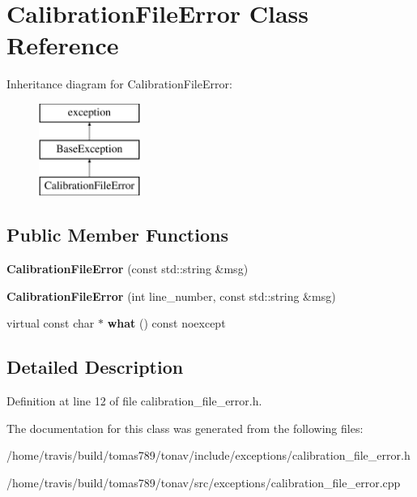 \hypertarget{class_calibration_file_error}{\section{Calibration\-File\-Error Class Reference}
\label{class_calibration_file_error}
}
Inheritance diagram for Calibration\-File\-Error\-:\begin{figure}[H]
\begin{center}
\leavevmode
\includegraphics[height=3.000000cm]{class_calibration_file_error}
\end{center}
\end{figure}
\subsection*{Public Member Functions}
\begin{DoxyCompactItemize}
\item 
\hypertarget{class_calibration_file_error_ac4403a65bb13617f6f9aaea23a408c0a}{{\bfseries Calibration\-File\-Error} (const std\-::string \&msg)}\label{class_calibration_file_error_ac4403a65bb13617f6f9aaea23a408c0a}

\item 
\hypertarget{class_calibration_file_error_a91d41fb29208c4304760a251de8ca50a}{{\bfseries Calibration\-File\-Error} (int line\-\_\-number, const std\-::string \&msg)}\label{class_calibration_file_error_a91d41fb29208c4304760a251de8ca50a}

\item 
\hypertarget{class_calibration_file_error_a935a4e242a42bb1ab4867c05f44eebc9}{virtual const char $\ast$ {\bfseries what} () const noexcept}\label{class_calibration_file_error_a935a4e242a42bb1ab4867c05f44eebc9}

\end{DoxyCompactItemize}


\subsection{Detailed Description}


Definition at line 12 of file calibration\-\_\-file\-\_\-error.\-h.



The documentation for this class was generated from the following files\-:\begin{DoxyCompactItemize}
\item 
/home/travis/build/tomas789/tonav/include/exceptions/calibration\-\_\-file\-\_\-error.\-h\item 
/home/travis/build/tomas789/tonav/src/exceptions/calibration\-\_\-file\-\_\-error.\-cpp\end{DoxyCompactItemize}
